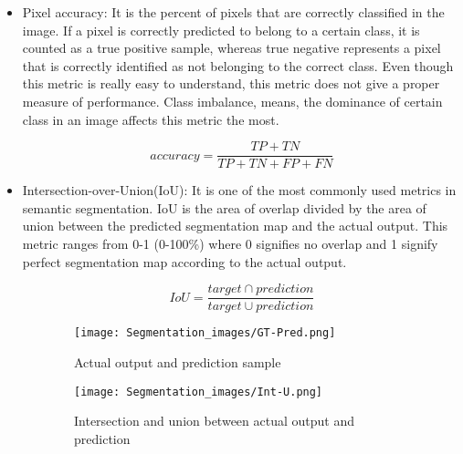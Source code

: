 \begin{itemize}
    
\item Pixel accuracy: It is the percent of pixels that are correctly classified in the image. If a pixel is correctly predicted to belong to a certain class, it is counted as a true positive sample, whereas true negative represents a pixel that is correctly identified as not belonging to the correct class. Even though this metric is really easy to understand, this metric does not give a proper measure of performance. Class imbalance, means, the dominance of certain class in an image affects this metric the most. 

    \begin{equation}
        accuracy = \dfrac{TP + TN }{TP + TN + FP + FN}
    \end{equation}
    
\item Intersection-over-Union(IoU): It is one of the most commonly used metrics in semantic segmentation. IoU is the area of overlap divided by the area of union between the predicted segmentation map and the actual output. This metric ranges from 0-1 (0-100\%) where 0 signifies no overlap and 1 signify perfect segmentation map according to the actual output. 

    \begin{equation}
        IoU = \dfrac{target \cap prediction }{target \cup  prediction}
    \end{equation}


\end{itemize}

\begin{figure}[h!]
  \centering
  \begin{subfigure}[b]{10cm}
    \texttt{[image: Segmentation\_images/GT-Pred.png]}
    \caption{Actual output and prediction sample}
  \end{subfigure}
  \begin{subfigure}[b]{10cm}
    \texttt{[image: Segmentation\_images/Int-U.png]}
    \caption{Intersection and union between actual output and prediction}
  \end{subfigure}
  \caption{\cite{JJ}}
  \label{fig:mou&pix}
\end{figure}


    
